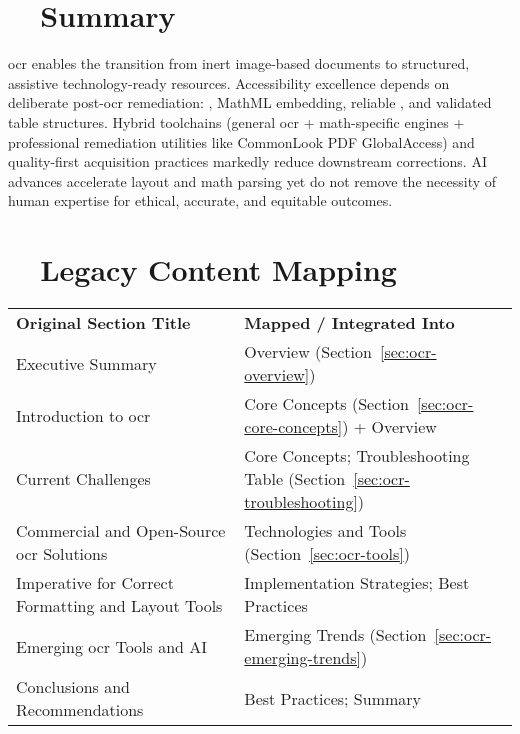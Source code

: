 \section{~~Summary}
\label{sec:ocr-summary}
\gls{ocr} enables the transition from inert image-based documents to structured, assistive technology-ready resources. Accessibility excellence depends on deliberate post-\gls{ocr} remediation: , MathML embedding, reliable , and validated table structures. Hybrid toolchains (general \gls{ocr} + math-specific engines + professional remediation utilities like CommonLook PDF GlobalAccess\supercite{AllyantCommonLook}) and quality-first acquisition practices markedly reduce downstream corrections. AI advances accelerate layout and math parsing yet do not remove the necessity of human expertise for ethical, accurate, and equitable outcomes.

\section{~~Legacy Content Mapping}
\label{sec:ocr-legacy-mapping}
\begin{tabular}{p{} p{}}
	\textbf{Original Section Title}                    & \textbf{Mapped / Integrated Into}                                            \\
	Executive Summary                                  & Overview (Section~\ref{sec:ocr-overview})                                    \\
	Introduction to \gls{ocr}                          & Core Concepts (Section~\ref{sec:ocr-core-concepts}) + Overview               \\
	Current Challenges                                 & Core Concepts; Troubleshooting Table (Section~\ref{sec:ocr-troubleshooting}) \\
	Commercial and Open-Source \gls{ocr} Solutions     & Technologies and Tools (Section~\ref{sec:ocr-tools})                         \\
	Imperative for Correct Formatting and Layout Tools & Implementation Strategies; Best Practices                                    \\
	Emerging \gls{ocr} Tools and AI                    & Emerging Trends (Section~\ref{sec:ocr-emerging-trends})                      \\
	Conclusions and Recommendations                    & Best Practices; Summary                                                      \\
\end{tabular}

